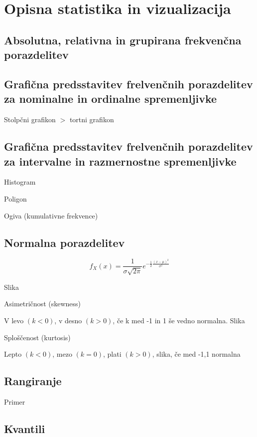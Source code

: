 \section{Opisna statistika in vizualizacija}

\subsection*{Absolutna, relativna in grupirana frekvenčna porazdelitev}

\subsection*{Grafična predsstavitev frelvenčnih porazdelitev za nominalne in ordinalne spremenljivke}

Stolpčni grafikon $>$ tortni grafikon

\subsection*{Grafična predsstavitev frelvenčnih porazdelitev za intervalne in razmernostne spremenljivke}

Histogram

Poligon

Ogiva (kumulativne frekvence)

\subsection*{Normalna porazdelitev}

\[f_X(x)=\frac{1}{\sigma\sqrt{2\pi}}e^{-\frac{1}{2}\frac{(x-\mu)^2}{\sigma^2}}\]

Slika

Asimetričnost (skewness)

V levo $(k<0)$, v desno $(k>0)$, če k med -1 in 1 še vedno normalna. Slika

Sploščenost (kurtosis)

Lepto $(k<0)$, mezo $(k=0)$, plati $(k>0)$, slika, če med -1,1 normalna

\subsection*{Rangiranje}

Primer

\subsection*{Kvantili}

